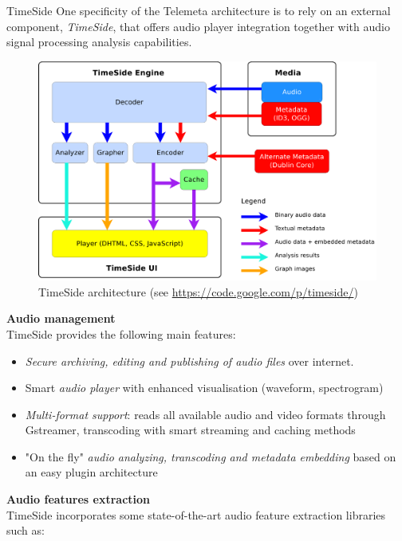 \documentclass[final, hyperref, table]{beamer}
\begin{document}
\begin{frame}[containsverbatim]{}
\begin{columns}[t]
\begin{column}[T]{.49\linewidth}
  \begin{block}{TimeSide}\small
One specificity of the Telemeta architecture is to rely on an external component, \emph{TimeSide}, that offers audio player integration together with audio signal processing analysis capabilities.
    \begin{figure}[htbp]
  \centering
  \includegraphics[width=0.4\paperwidth]{../img/timeside_schema.pdf}
  \caption{TimeSide architecture (see \url{https://code.google.com/p/timeside/})}\label{fig:TimeSide_Archi}
\end{figure}
\textbf{Audio management}\\
TimeSide provides the following main features:
\begin{itemize}
\item \emph{Secure archiving, editing and publishing of audio files} over
  internet.
\item Smart \emph{audio player} with enhanced visualisation (waveform, spectrogram)
\item \emph{Multi-format support}: reads all available audio and video formats  through Gstreamer, transcoding with smart streaming and caching methods
\item "On the fly" \emph{audio analyzing, transcoding and metadata
    embedding} based on an easy plugin architecture
\end{itemize}

\textbf{Audio features extraction}\\
TimeSide incorporates some state-of-the-art audio feature extraction libraries such as:


\end{block}
\end{column}
\end{columns}
\end{frame}
\end{document}
